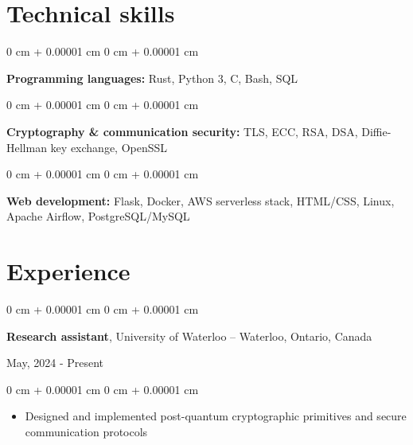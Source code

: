 \documentclass[10pt, letterpaper]{article}
\newenvironment{highlights}{
    \begin{itemize}[
        topsep=0.10 cm,
        parsep=0.10 cm,
        partopsep=0pt,
        itemsep=0pt,
        leftmargin=0 cm + 10pt
    ]
}{
    \end{itemize}
} %
\newenvironment{onecolentry}{
    \begin{adjustwidth}{
        0 cm + 0.00001 cm
    }{
        0 cm + 0.00001 cm
    }
}{
    \end{adjustwidth}
} %
\newenvironment{twocolentry}[2][]{
    \onecolentry
    \def\secondColumn{#2}
    \setcolumnwidth{\fill, 4.5 cm}
    \begin{paracol}{2}
}{
    \switchcolumn \raggedleft \secondColumn
    \end{paracol}
    \endonecolentry
} %
\begin{document}
    \section{Technical skills}
        \begin{onecolentry}
            \textbf{Programming languages:} Rust, Python 3, C, Bash, SQL
        \end{onecolentry}
        \vspace{0.2 cm}
        \begin{onecolentry}
            \textbf{Cryptography \& communication security:} TLS, ECC, RSA, DSA, Diffie-Hellman key exchange, OpenSSL
        \end{onecolentry}
        \vspace{0.2 cm}
        \begin{onecolentry}
            \textbf{Web development:} Flask, Docker, AWS serverless stack, HTML/CSS, Linux, Apache Airflow, PostgreSQL/MySQL
        \end{onecolentry}

    \section{Experience}
        \begin{twocolentry}{
            May, 2024 - Present
        }
            \textbf{Research assistant}, University of Waterloo -- Waterloo, Ontario, Canada
        \end{twocolentry}
        \vspace{0.10 cm}
        \begin{onecolentry}
            \begin{highlights}
                \item Designed and implemented post-quantum cryptographic primitives and secure communication protocols
            \end{highlights}
        \end{onecolentry}
        \vspace{0.2 cm}
\end{document}
